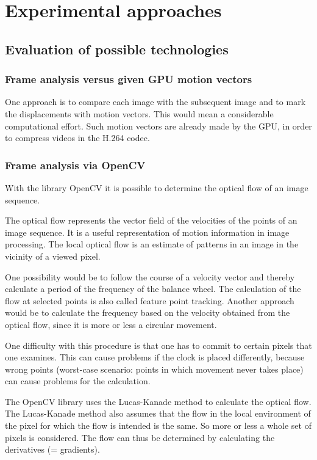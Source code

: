 \documentclass[12pt, a4paper]{report}
\begin{document}
\chapter {Experimental approaches}

\section {Evaluation of possible technologies}
\subsection{Frame analysis versus given GPU motion vectors}
One approach is to compare each image with the subsequent image and to mark the displacements with motion vectors. This would mean a considerable computational effort.
Such motion vectors are already made by the GPU, in order to compress videos in the H.264 codec.

\subsection{Frame analysis via OpenCV}
With the library OpenCV it is possible to determine the optical flow of an image sequence. 

The optical flow represents the vector field of the velocities of the points of an image sequence. It is a useful representation of motion information in image processing. The local optical flow is an estimate of patterns in an image in the vicinity of a viewed pixel. 

One possibility would be to follow the course of a velocity vector and thereby calculate a period of the frequency of the balance wheel. The calculation of the flow at selected points is also called feature point tracking. Another approach would be to calculate the frequency based on the velocity obtained from the optical flow, since it is more or less a circular movement. 

One difficulty with this procedure is that one has to commit to certain pixels that one examines. This can cause problems if the clock is placed differently, because wrong points (worst-case scenario: points in which movement never takes place) can cause problems for the calculation.  

The OpenCV library uses the Lucas-Kanade method to calculate the optical flow. The Lucas-Kanade method also assumes that the flow in the local environment of the pixel for which the flow is intended is the same. So more or less a whole set of pixels is considered. The flow can thus be determined by calculating the derivatives (= gradients). 
\end{document}
